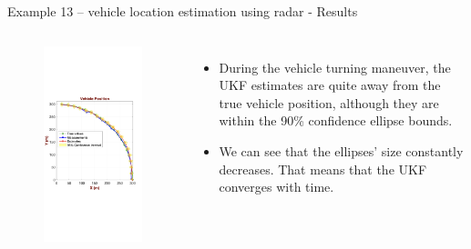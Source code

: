 \begin{frame}{Example 13 – vehicle location estimation using radar - Results}
\begin{columns}
        \begin{figure}
            \centering
            \includegraphics[trim={0 7cm 0 4cm},clip, width=0.8\linewidth]{Figures//Part3/Ex13_ZoomedPosition_CurvedSegment.png}
        \end{figure}
        \begin{itemize}            
            \item During the vehicle turning maneuver, the UKF estimates are quite away from the true vehicle position, although they are within the 90\% confidence ellipse bounds.
            \item We can see that the ellipses’ size constantly decreases. That means that the UKF converges with time.
        \end{itemize}
\end{columns}    
\end{frame}

